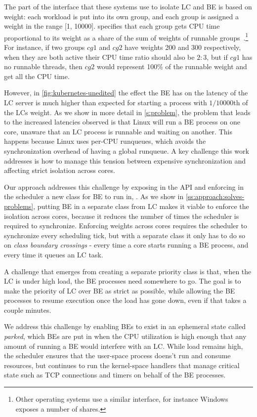 The part of the \cgroups{} interface that these systems use to isolate LC and BE
is based on weight: each workload is put into its own group, and each group is
assigned a weight in the range [1, 10000]. \cgroups{} specifies that each group
gets CPU time proportional to its weight as a share of the sum of weights of
runnable groups~\cite{cgroups-kerneldocs}.\footnote{Other operating systems use
a similar interface, for instance Windows exposes a number of shares.} For
instance, if two groups $cg1$ and $cg2$ have weights 200 and 300 respectively,
when they are both active their CPU time ratio should also be $2:3$, but if
$cg1$ has no runnable threads, then $cg2$ would represent 100\% of the runnable
weight and get all the CPU time.

However, in \autoref{fig:kubernetes-unedited} the effect the BE has on the
latency of the LC server is much higher than expected for starting a process
with $1/10000$th of the LCs weight. As we show in more detail in
\autoref{s:problem}, the problem that leads to the increased latencies observed
is that Linux will run a BE process on one core, unaware that an LC process is
runnable and waiting on another. This happens because Linux uses per-CPU
runqueues, which avoids the synchronization overhead of having a global
runqueue. A key challenge this work addresses is how to manage this tension
between expensive synchronization and affecting strict isolation across
cores.

Our approach addresses this challenge by exposing in the API and enforcing in
the scheduler a new class for BE to run in, \beclass{}. As we show in
\autoref{ss:approach:solves-problems}, putting BE in a separate class from LC
makes it viable to enforce the isolation across cores, because it reduces the
number of times the scheduler is required to synchronize. Enforcing weights
across cores requires the scheduler to synchronize every scheduling tick, but
with a separate class it only has to do so on \textit{class boundary crossings}
- every time a core starts running a BE process, and every time it queues an LC
task.

A challenge that emerges from creating a separate priority class is that, when
the LC is under high load, the BE processes need somewhere to go. The goal is to
make the priority of LC over BE as strict as possible, while allowing the BE
processes to resume execution once the load has gone down, even if that takes a
couple minutes.

We address this challenge by enabling BEs to exist in an ephemeral state called
\textit{parked}, which BEs are put in when the CPU utilization is high enough
that any amount of running a BE would interfere with an LC. While load remains
high, the scheduler ensures that the user-space process doens't run and consume
resources, but continues to run the kernel-space handlers that manage critical
state such as TCP connections and timers on behalf of the BE processes. 


